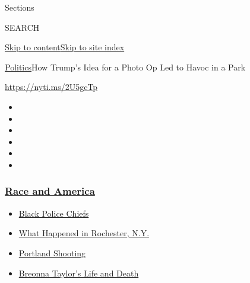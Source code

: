 Sections

SEARCH

\protect\hyperlink{site-content}{Skip to
content}\protect\hyperlink{site-index}{Skip to site index}

\href{/section/politics}{Politics}\textbar{}How Trump's Idea for a Photo
Op Led to Havoc in a Park

\url{https://nyti.ms/2U5gcTp}

\begin{itemize}
\item
\item
\item
\item
\item
\item
\end{itemize}

\hypertarget{race-and-america}{%
\subsubsection{\texorpdfstring{\href{https://www.nytimes3xbfgragh.onion/news-event/george-floyd-protests-minneapolis-new-york-los-angeles?name=styln-george-floyd\&region=TOP_BANNER\&block=storyline_menu_recirc\&action=click\&pgtype=Article\&impression_id=917b1a00-f4c5-11ea-90f6-17a6587a4d59\&variant=undefined}{Race
and America}}{Race and America}}\label{race-and-america}}

\begin{itemize}
\tightlist
\item
  \href{https://www.nytimes3xbfgragh.onion/2020/09/11/us/black-police-chiefs-reform.html?name=styln-george-floyd\&region=TOP_BANNER\&block=storyline_menu_recirc\&action=click\&pgtype=Article\&impression_id=917b1a01-f4c5-11ea-90f6-17a6587a4d59\&variant=undefined}{Black
  Police Chiefs}
\item
  \href{https://www.nytimes3xbfgragh.onion/2020/09/04/nyregion/rochester-police-daniel-prude.html?name=styln-george-floyd\&region=TOP_BANNER\&block=storyline_menu_recirc\&action=click\&pgtype=Article\&impression_id=917b8f30-f4c5-11ea-90f6-17a6587a4d59\&variant=undefined}{What
  Happened in Rochester, N.Y.}
\item
  \href{https://www.nytimes3xbfgragh.onion/2020/08/30/us/portland-shooting-explained.html?name=styln-george-floyd\&region=TOP_BANNER\&block=storyline_menu_recirc\&action=click\&pgtype=Article\&impression_id=917bb640-f4c5-11ea-90f6-17a6587a4d59\&variant=undefined}{Portland
  Shooting}
\item
  \href{https://www.nytimes3xbfgragh.onion/2020/08/30/us/breonna-taylor-police-killing.html?name=styln-george-floyd\&region=TOP_BANNER\&block=storyline_menu_recirc\&action=click\&pgtype=Article\&impression_id=917bb641-f4c5-11ea-90f6-17a6587a4d59\&variant=undefined}{Breonna
  Taylor's Life and Death}
\end{itemize}


